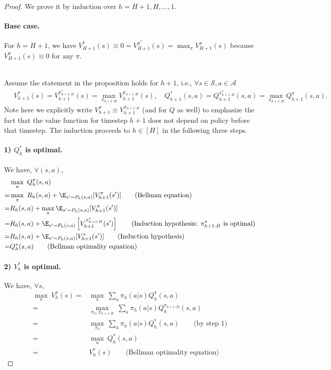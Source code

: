 \begin{proof}
We prove it by induction over $h=H+1,H,\ldots,1$.

\paragraph{Base case.} For $h=H+1$, we have $V^*_{H+1}(s)\equiv0=V^{\pi^*}_{H+1}(s)=\max _\pi V_{H+1}^\pi(s)$ because $V^\pi_{H+1}(s)\equiv0$ for any $\pi$.

~\\
Assume the statement in the proposition holds for $h+1$, i.e.,
$\forall s\in\mathcal{S}, a\in\mathcal{A}$
\begin{align*}
    \quad V_{h+1}^*(s)=V^{\pi^*_{h+1:H}}_{h+1}(s)=\max _{\pi_{h+1:H}} V_{h+1}^{\pi_{h+1:H}}(s), \quad Q_{h+1}^*(s, a)=Q^{\pi^*_{h+1:H}}_{h+1}(s,a)=\max_{\pi_{h+1:H}} Q_{h+1}^\pi(s, a)
    .
\end{align*}
Note here we explicitly write $V^\pi_{h+1}\equiv V^{\pi_{h+1:H}}_{h+1}$ (and for $Q$ as well) to emphasize the fact that the value function for timestep $h+1$ does not depend on policy before that timestep.
The induction proceeds to $h\in[H]$ in the following three steps.
\paragraph{1) $Q^*_h$ is optimal.}
We have, $\forall (s,a)$, 
\begin{align*}
&\max_\pi ~ Q_h^\pi(s, a) \\
=&\max _\pi ~ R_h(s, a)+\E_{s'\sim P_h(s, a)} [V_{h+1}^\pi(s')] \qquad\text{(Bellman equation)}\\
=&R_h(s, a)+\max _\pi \E_{s'\sim P_h(s, a)} [V_{h+1}^\pi(s')] \\
=&R_h(s, a)+\E_{s'\sim P_h(s, a)} \left[V_{h+1}^{\pi^*_{h+1:H}}(s')\right] \qquad\text{(Induction hypothesis: $\pi^*_{h+1:H}$ is optimal)}\\
=&R_h(s, a)+\E_{s'\sim P_h(s, a)} [V_{h+1}^*(s')] \qquad\text{(Induction hypothesis)}\\
=&Q_h^*(s, a) \qquad\text{(Bellman optimality equation)}
\end{align*}

\paragraph{2) $V^*_h$ is optimal.}
We have, $\forall s$, 
\begin{align*}
\max_\pi ~V_h^\pi(s)
=&\max_\pi ~\sum_a \pi_h(a | s) Q_h^\pi(s, a) \\
=&\max_{\pi_h, \pi_{h+1: H}} ~\sum_a \pi_h(a | s) Q_h^{\pi_{h+1: H}}(s, a)\\ 
=&\max_{\pi_h} ~\sum_a \pi_h(a | s) Q_h^*(s, a)  \qquad\text{(by step 1)}  \\
=&\max_a ~Q^*_h(s,a) \\
=&V^*_h(s) \qquad\text{(Bellman optimality equation)}
\end{align*}


\end{proof}
